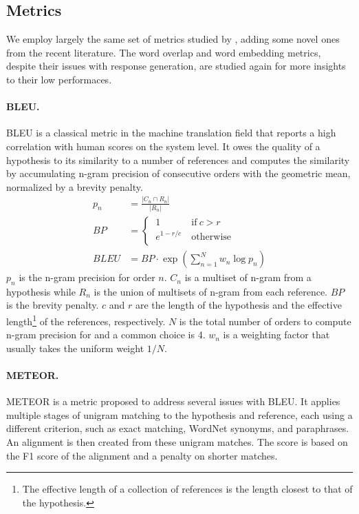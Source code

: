 \documentclass[runningheads]{llncs}
\begin{document}
    \subsection{Metrics}
    We employ largely the same set of metrics studied by \cite{HowNot}, adding some novel ones from the recent literature. The word overlap and word embedding metrics, despite their issues with response generation, are studied again for more insights to their low performaces.

    \paragraph{BLEU.}
    BLEU \cite{BLEU} is a classical metric in the machine translation field that reports a high correlation with human scores on the system level. It owes the quality of a hypothesis to its similarity to a number of references and computes the similarity by accumulating n-gram precision of consecutive orders with the geometric mean, normalized by a brevity penalty.
    \begin{align}
        p_n &= \frac{ |C_n \cap R_n| }{ |R_n| } \\
        \textit{BP} &=
        \begin{cases}
            \ 1 \ & \text{if} \  c > r \\
            \ e^{1 - r/c} \ & \text{otherwise} \\
        \end{cases} \\
        \textit{BLEU} &=
        \textit{BP} \cdot \exp \left( \sum_{n=1}^N w_n \log p_n \right)
    \end{align}
    $p_n$ is the n-gram precision for order $n$. $C_n$ is a multiset of n-gram from a hypothesis while $R_n$ is the union of multisets of n-gram from each reference. $\textit{BP}$ is the brevity penalty. $c$ and $r$ are the length of the hypothesis and the effective length\footnote{The effective length of a collection of references is the length closest to that of the hypothesis.} of the references, respectively. $N$ is the total number of orders to compute n-gram precision for and a common choice is 4. $w_n$ is a weighting factor that usually takes the uniform weight $1 / N$.

    \paragraph{METEOR.}
    METEOR \cite{METEOR} is a metric proposed to address several issues with BLEU. It applies multiple stages of unigram matching to the hypothesis and reference, each using a different criterion, such as exact matching, WordNet synonyms, and paraphrases. An alignment is then created from these unigram matches. The score is based on the F1 score of the alignment and a penalty on shorter matches.
\end{document}
